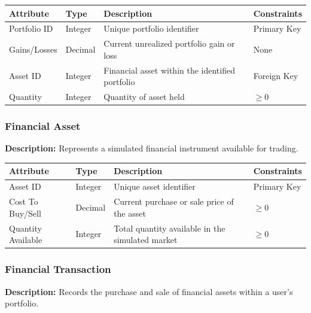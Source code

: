 \documentclass[12pt]{article}
\begin{document}
\begin{xltabular}{\textwidth}{|p{3cm}|p{2cm}|X|p{3cm}|} 
    \hline 
    \textbf{Attribute} & \textbf{Type} & \textbf{Description} & \textbf{Constraints} \\ 
    \hline 
    
    Portfolio ID & Integer & Unique portfolio identifier & Primary Key \\ 
    \hline 
    
    Gains/Losses & Decimal & Current unrealized portfolio gain or loss & None \\ 
    \hline 
    
    Asset ID & Integer & Financial asset within the identified portfolio & Foreign Key \\ 
    \hline 
    
    Quantity & Integer & Quantity of asset held & $\geq 0$ \\ 
    \hline 
\end{xltabular}

\subsubsection{Financial Asset} 

\textbf{Description:} Represents a simulated financial instrument available for trading. 

\begin{xltabular}{\textwidth}{|p{3cm}|p{2cm}|X|p{3cm}|} 
    \hline 
    \textbf{Attribute} & \textbf{Type} & \textbf{Description} & \textbf{Constraints} \\ 
    \hline 
    
    Asset ID & Integer & Unique asset identifier & Primary Key \\ 
    \hline 
    
    Cost To Buy/Sell & Decimal & Current purchase or sale price of the asset & $\geq 0$ \\ 
    \hline 
    
    Quantity Available & Integer & Total quantity available in the simulated market & $\geq 0$ \\ 
    \hline 
\end{xltabular}

\subsubsection{Financial Transaction} 

\textbf{Description:} Records the purchase and sale of financial assets within a user's portfolio. 
\end{document}
